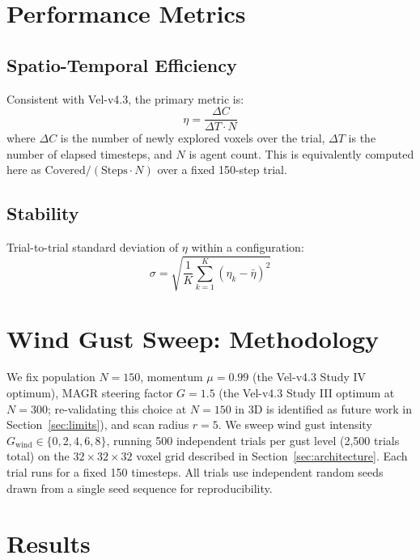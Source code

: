 \documentclass[10pt,journal]{IEEEtran}
\begin{document}
\section{Performance Metrics}
\label{sec:metrics}

\subsection{Spatio-Temporal Efficiency}
Consistent with Vel-v4.3, the primary metric is:
\begin{equation}
\eta = \frac{\Delta C}{\Delta T \cdot N}
\end{equation}
where $\Delta C$ is the number of newly explored voxels over the trial,
$\Delta T$ is the number of elapsed timesteps, and $N$ is agent count. This
is equivalently computed here as $\text{Covered}/(\text{Steps}\cdot N)$ over
a fixed 150-step trial.

\subsection{Stability}
Trial-to-trial standard deviation of $\eta$ within a configuration:
\begin{equation}
\sigma = \sqrt{\frac{1}{K}\sum_{k=1}^{K}(\eta_k - \bar{\eta})^2}
\end{equation}

\section{Wind Gust Sweep: Methodology}
\label{sec:study}

We fix population $N=150$, momentum $\mu=0.99$ (the Vel-v4.3 Study IV
optimum), MAGR steering factor $G=1.5$ (the Vel-v4.3 Study III optimum at
$N=300$; re-validating this choice at $N=150$ in 3D is identified as future
work in Section~\ref{sec:limits}), and scan radius $r=5$. We sweep wind
gust intensity $G_{\text{wind}} \in \{0,2,4,6,8\}$, running 500 independent
trials per gust level (2{,}500 trials total) on the $32\times32\times32$
voxel grid described in Section~\ref{sec:architecture}. Each trial runs for
a fixed 150 timesteps. All trials use independent random seeds drawn from a
single seed sequence for reproducibility.

\section{Results}
\label{sec:results}
\end{document}
